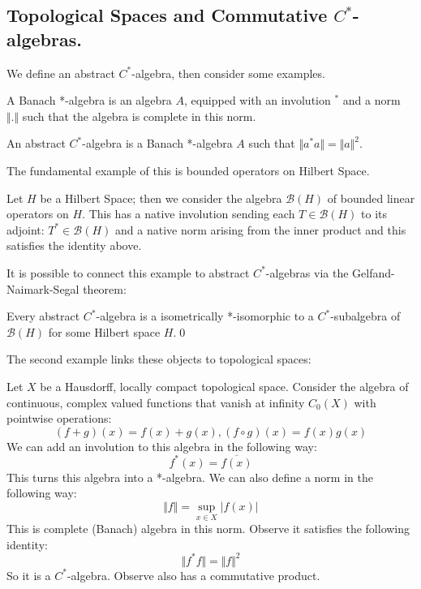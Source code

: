 \begin{example}
\subsection{Topological Spaces and Commutative $C^{*}$-algebras.}

We define an abstract $C^{*}$-algebra, then consider some examples.

\begin{definition}
A Banach *-algebra is an algebra $A$, equipped with an involution $^{*}$ and a norm $\Vert . \Vert$ such that the algebra is complete in this norm.
\end{definition}

\begin{definition}
An abstract $C^{*}$-algebra is a Banach *-algebra $A$ such that $\Vert a^{*}a \Vert = \Vert a \Vert^{2}$.
\end{definition}

The fundamental example of this is bounded operators on Hilbert Space.

\begin{example}
Let $H$ be a Hilbert Space; then we consider the algebra $\mathcal{B}(H)$ of bounded linear operators on $H$. This has a native involution sending each $T \in \mathcal{B}(H)$ to its adjoint: $T^{*} \in \mathcal{B}(H)$ and a native norm arising from the inner product and this satisfies the identity above.
\end{example}

It is possible to connect this example to abstract $C^{*}$-algebras via the Gelfand-Naimark-Segal theorem:

\begin{theorem}
Every abstract $C^{*}$-algebra is a isometrically *-isomorphic to a $C^{*}$-subalgebra of $\mathcal{B}(H)$ for some Hilbert space $H$.\qed
\end{theorem}

The second example links these objects to topological spaces:

\begin{example}
Let $X$ be a Hausdorff, locally compact topological space. Consider the algebra of continuous, complex valued functions that vanish at infinity $C_{0}(X)$ with pointwise operations:
\begin{equation*}
(f+g)(x)=f(x)+g(x), (f\circ g)(x)=f(x)g(x)
\end{equation*}
We can add an involution to this algebra in the following way:
\begin{equation*}
f^{*}(x)=\overline{f(x)}
\end{equation*}
This turns this algebra into a *-algebra. We can also define a norm in the following way:
\begin{equation*}
\Vert f \Vert = \sup_{x \in X} \vert f(x) \vert
\end{equation*}
This is complete (Banach) algebra in this norm. Observe it satisfies the following identity:
\begin{equation*}
\Vert f^{*}f \Vert = \Vert f \Vert^{2}
\end{equation*}
So it is a $C^{*}$-algebra. Observe also has a commutative product.
\end{example}


\end{example}
